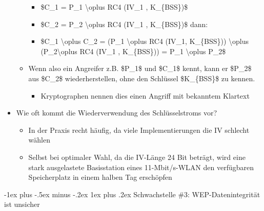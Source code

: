 \documentclass[a4paper]{article}
\makeatletter
\renewcommand{\subsubsection}{\@startsection{subsubsection}{3}{0mm}%
 {-1ex plus -.5ex minus -.2ex}%
 {1ex plus .2ex}%
 {\normalfont\small\bfseries}}
\makeatother
\begin{document}
\begin{multicols}{3}
\begin{itemize}
\begin{itemize}
                        \begin{itemize}
                            \item
                                  \$C\_1 = P\_1 \textbackslash oplus RC4 (IV\_1 , K\_\{BSS\})\$
                            \item
                                  \$C\_2 = P\_2 \textbackslash oplus RC4 (IV\_1 , K\_\{BSS\})\$
                                  dann:
                            \item
                                  \$C\_1 \textbackslash oplus C\_2 = (P\_1 \textbackslash oplus RC4
                                  (IV\_1, K\_\{BSS\})) \textbackslash oplus
                                  (P\_2\textbackslash oplus RC4 (IV\_1 , K\_\{BSS\})) = P\_1
                                  \textbackslash oplus P\_2\$
                        \end{itemize}
                  \item
                        Wenn also ein Angreifer z.B. \$P\_1\$ und \$C\_1\$ kennt, kann er
                        \$P\_2\$ aus \$C\_2\$ wiederherstellen, ohne den Schlüssel
                        \$K\_\{BSS\}\$ zu kennen.

                        \begin{itemize}
                            \item
                                  Kryptographen nennen dies einen Angriff mit bekanntem Klartext
                        \end{itemize}
              \end{itemize}
        \item
              Wie oft kommt die Wiederverwendung des Schlüsselstroms vor?

              \begin{itemize}
                  \item
                        In der Praxis recht häufig, da viele Implementierungen die IV
                        schlecht wählen
                  \item
                        Selbst bei optimaler Wahl, da die IV-Länge 24 Bit beträgt, wird eine
                        stark ausgelastete Basisstation eines 11-Mbit/s-WLAN den verfügbaren
                        Speicherplatz in einem halben Tag erschöpfen
              \end{itemize}
    \end{itemize}


    \subsubsection{Schwachstelle \#3: WEP-Datenintegrität ist
        unsicher}


\end{multicols}
\end{document}
